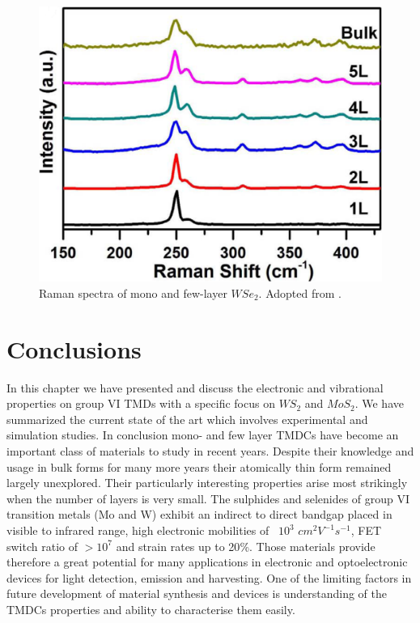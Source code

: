 \begin{figure}[H]
	\begin{center}
		\includegraphics[scale=0.2]{WSe2RamanSpectra.png}
		\caption{Raman spectra of mono and few-layer $WSe_2$. Adopted from \cite{Terrones2014}.}
		\label{fig:WSe2RamanSpectra}
	\end{center}
\end{figure}

\newpage
\section{Conclusions}

In this chapter we have presented and discuss the electronic and vibrational properties on group VI TMDs with a specific focus on $WS_2$ and $MoS_2$. We have summarized the current state of the art which involves experimental and simulation studies. In conclusion mono- and few layer TMDCs have become an important class of materials to study in recent years. Despite their knowledge and usage in bulk forms for many more years their atomically thin form remained largely unexplored. Their particularly interesting properties arise most strikingly when the number of layers is very small. The sulphides and selenides of group VI transition metals  (Mo and W) exhibit an indirect to direct bandgap placed in visible to infrared range, high electronic mobilities of ~$10^3$ $cm^2 V^{-1} s^{-1}$, FET switch ratio of $>10^7$ and strain rates up to 20{\%}. Those materials provide therefore a great potential for many applications in electronic and optoelectronic devices for light detection, emission and harvesting. One of the limiting factors in future development of material synthesis and devices is understanding of the TMDCs properties and ability to characterise them easily.